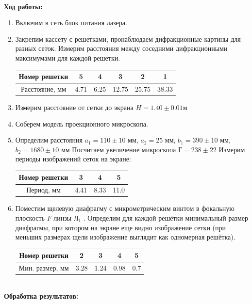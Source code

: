 \documentclass[a4paper, 12pt]{article}
\begin{document}
\textbf{\\Ход работы:}

\begin{enumerate}
    \item Включим в сеть блок питания лазера.
    \item Закрепим кассету с решетками, пронаблюдаем дифракционные картины для разных сеток. Измерим расстояния между соседними дифракционными максимумами для каждой решетки.
    
        \begin{tabular}{|c|c|c|c|c|c|} \hline
            Номер решетки & 5 & 4 & 3 & 2 & 1 \\ \hline
            Расстояние, мм & 4.71 & 6.25 & 12.75 & 25.75 & 38.33 \\ \hline
        \end{tabular}

    \item Измерим расстояние от сетки до экрана $H = 1.40 \pm 0.01 м$
    \item Соберем модель проекционного микроскопа. 
    \item Определим расстояния $a_1 = 110 \pm 10$ мм, $a_2 = 25$ мм, $b_1 = 390 \pm 10$ мм, $b_2 = 1680 \pm 10$ мм
        Посчитаем увеличение микроскопа $Г = 238 \pm 22$
        Измерим периоды изображений сеток на экране:

        \begin{tabular}{|c|c|c|c|} \hline
            Номер решетки & 3 & 4 & 5 \\ \hline
            Период, мм & 4.41 & 8.33 & 11.0 \\ \hline
        \end{tabular}

    \item Поместим щелевую диафрагму с микрометрическим винтом в фокальную плоскость $F$ линзы $Л_1$ . Определим для каждой решётки минимальный размер диафрагмы, при котором на экране еще видно изображение сетки (при меньших размерах щели изображение выглядит как одномерная решётка).
    
        \begin{tabular}{|c|c|c|c|c|} \hline
            Номер решетки & 2 & 3 & 4 & 5 \\ \hline
            Мин. размер, мм & 3.28 & 1.24 & 0.98 & 0.7 \\ \hline
        \end{tabular}
\end{enumerate}

\textbf{\\Обработка результатов:}
\end{document}
